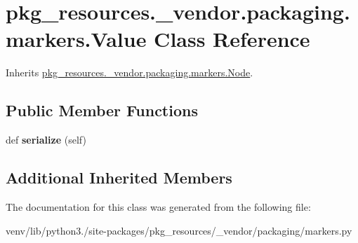 \hypertarget{classpkg__resources_1_1__vendor_1_1packaging_1_1markers_1_1_value}{}\section{pkg\+\_\+resources.\+\_\+vendor.\+packaging.\+markers.\+Value Class Reference}
\label{classpkg__resources_1_1__vendor_1_1packaging_1_1markers_1_1_value}


Inherits \hyperlink{classpkg__resources_1_1__vendor_1_1packaging_1_1markers_1_1_node}{pkg\+\_\+resources.\+\_\+vendor.\+packaging.\+markers.\+Node}.

\subsection*{Public Member Functions}
\begin{DoxyCompactItemize}
\item 
\mbox{\label{classpkg__resources_1_1__vendor_1_1packaging_1_1markers_1_1_value_a1954ee7747ad3d3b6ea03a9c61fedd03}} 
def {\bfseries serialize} (self)
\end{DoxyCompactItemize}
\subsection*{Additional Inherited Members}


The documentation for this class was generated from the following file\+:\begin{DoxyCompactItemize}
\item 
venv/lib/python3./site-\/packages/pkg\+\_\+resources/\+\_\+vendor/packaging/markers.\+py\end{DoxyCompactItemize}
